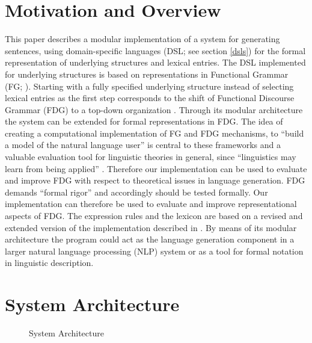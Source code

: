 \documentclass[a4paper, halfparskip, onecolumn, abstractoff, final]{scrartcl}
\begin{document}
\section{Motivation and Overview}
This paper describes a modular implementation of a system for generating sentences, using domain-specific languages (DSL; see section \ref{dsls}) for the formal representation of underlying structures and lexical entries. The DSL implemented for underlying structures is based on representations in Functional Grammar (FG; \citealt{Dik1997a}). Starting with a fully specified underlying structure instead of selecting lexical entries as the first step corresponds to the shift of Functional Discourse Grammar (FDG) to a top-down organization \citep{HengeveldAndMackenzie2006}. Through its modular architecture the system can be extended for formal representations in FDG. The idea of creating a computational implementation of FG and FDG mechanisms, to ``build a model of the natural language user'' \citep[1]{Dik1997a} is central to these frameworks and a valuable evaluation tool for linguistic theories in general, since ``linguistics may learn from being applied'' \citep[4]{Bakker1994}. Therefore our implementation can be used to evaluate and improve FDG with respect to theoretical issues in language generation. FDG demands ``formal rigor'' \citep[668]{HengeveldAndMackenzie2006} and accordingly should be tested formally. Our implementation can therefore be used to evaluate and improve representational aspects of FDG. The expression rules and the lexicon are based on a revised and extended version of the implementation described in \cite{Samuelsdorff1989}. By means of its modular architecture the program could act as the language generation component in a larger natural language processing (NLP) system or as a tool for formal notation in linguistic description.

\section{System Architecture}

\begin{figure}
\begin{center}
\end{center}
\caption{System Architecture} \label{sysflow}
\end{figure}
\end{document}
